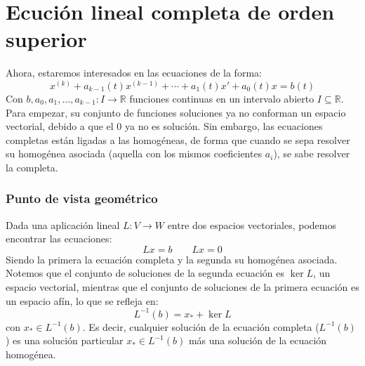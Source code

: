 \section{Ecución lineal completa de orden superior}
\noindent
Ahora, estaremos interesados en las ecuaciones de la forma:
\begin{equation*}
    x^{(k)} + a_{k-1}(t) x^{(k-1)} + \cdots + a_1(t) x' + a_0(t)x = b(t)
\end{equation*}
Con $b,a_0,a_1,\ldots,a_{k-1}:I\rightarrow\mathbb{R}$ funciones continuas en un intervalo abierto $I\subseteq \mathbb{R}$.\\

Para empezar, su conjunto de funciones soluciones ya no conforman un espacio vectorial, debido a que el 0 ya no es solución. Sin embargo, las ecuaciones completas están ligadas a las homogéneas, de forma que cuando se sepa resolver su homogénea asociada (aquella con los mismos coeficientes $a_i$), se sabe resolver la completa.

\subsubsection{Punto de vista geométrico}
\noindent
Dada una aplicación lineal $L:V\rightarrow W$ entre dos espacios vectoriales, podemos encontrar las ecuaciones:
\begin{equation*}
    Lx = b \qquad Lx = 0
\end{equation*}
Siendo la primera la ecuación completa y la segunda su homogénea asociada. Notemos que el conjunto de soluciones de la segunda ecuación es $\ker L$, un espacio vectorial, mientras que el conjunto de soluciones de la primera ecuación es un espacio afín, lo que se refleja en:
\begin{equation*}
    L^{-1}(b) = x_{\ast} + \ker L
\end{equation*}
con $x_{\ast}\in L^{-1}(b)$. Es decir, cualquier solución de la ecuación completa ($L^{-1}(b)$) es una solución particular $x_\ast\in L^{-1}(b)$ más una solución de la ecuación homogénea.

